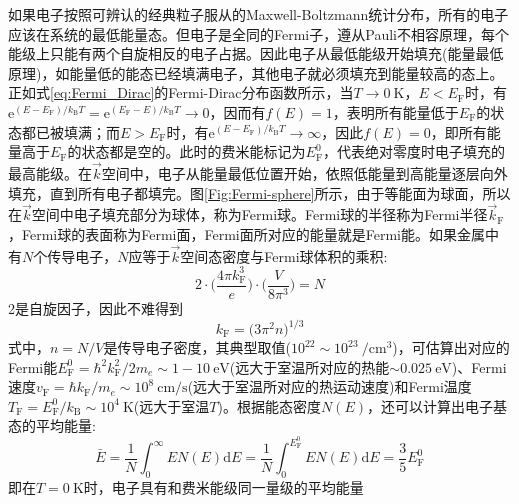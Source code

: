 \begin{itemize}
如果电子按照可辨认的经典粒子服从的Maxwell-Boltzmann统计分布，所有的电子应该在系统的最低能量态。但电子是全同的Fermi子，遵从Pauli不相容原理，每个能级上只能有两个自旋相反的电子占据。因此电子从最低能级开始填充(能量最低原理)，如能量低的能态已经填满电子，其他电子就必须填充到能量较高的态上。正如式\eqref{eq:Fermi_Dirac}的Fermi-Dirac分布函数所示，当$T\rightarrow0~\mathrm{K}$，$E<E_{\mathrm{F}}$时，有$\mathrm{e}^{(E-E_{\mathrm{F}})/k_{\mathrm{B}}T}=\mathrm{e}^{(E_{\mathrm{F}}-E)/k_{\mathrm{B}}T}\rightarrow0$，因而有$f(E)=1$，表明所有能量低于$E_{\mathrm{F}}$的状态都已被填满；而$E>E_{\mathrm{F}}$时，有$\mathrm{e}^{(E-E_{\mathrm{F}})/k_{\mathrm{B}}T}\rightarrow\infty$，因此$f(E)=0$，即所有能量高于$E_{\mathrm{F}}$的状态都是空的。此时的费米能标记为$E_{\mathrm{F}}^0$，代表绝对零度时电子填充的最高能级。在$\vec k$空间中，电子从能量最低位置开始，依照低能量到高能量逐层向外填充，直到所有电子都填完。图\ref{Fig:Fermi-sphere}所示，由于等能面为球面，所以在$\vec k$空间中电子填充部分为球体，称为Fermi球。Fermi球的半径称为Fermi半径$\vec k_{\mathrm{F}}$，Fermi球的表面称为Fermi面，Fermi面所对应的能量就是Fermi能。如果金属中有$N$个传导电子，$N$应等于$\vec k$空间态密度与Fermi球体积的乘积:
\begin{equation}
	2\cdot\bigg(\dfrac{4\pi k_{\mathrm F}^3}e\bigg)\cdot\bigg(\dfrac{V}{8\pi^3}\bigg)=N
	\label{eq:total_ele-Number}
\end{equation}
2是自旋因子，因此不难得到
\begin{equation}
	k_{\mathrm F}=\big(3\pi^2n\big)^{1/3}
	\label{eq:Fermi-radius}
\end{equation}
式中，$n=N/V$是传导电子密度，其典型取值($10^{22}\sim10^{23}~/\mathrm{cm}^3$)，可估算出对应的Fermi能$E_{\mathrm{F}}^0=\hbar^2k_{\mathrm F}^2/2m_e\sim1-10~\mathrm{eV}$(远大于室温所对应的热能$\sim0.025~\mathrm{eV}$)、Fermi速度$v_{\mathrm{F}}=\hbar k_{\mathrm{F}}/m_e\sim10^8~\mathrm{cm/s}$(远大于室温所对应的热运动速度)和Fermi温度$T_{\mathrm{F}}=E_{\mathrm{F}}^0/k_{\mathrm{B}}\sim10^4~\mathrm{K}$(远大于室温$T$)。根据能态密度$N(E)$，还可以计算出电子基态的平均能量:
\begin{equation}
	\bar{E}=\dfrac1N\int_0^{\infty}EN(E)\mathrm{d}E=\dfrac1N\int_0^{E_{\mathrm{F}}^0}EN(E)\mathrm{d}E=\dfrac35E_{\mathrm{F}}^0
	\label{eq:Electron_energy-ave}
\end{equation} 
即在$T=0~\mathrm{K}$时，电子具有和费米能级同一量级的平均能量


\end{itemize}
